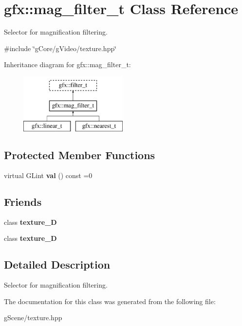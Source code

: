 \hypertarget{classgfx_1_1mag__filter__t}{\section{gfx\-:\-:mag\-\_\-filter\-\_\-t Class Reference}
\label{classgfx_1_1mag__filter__t}
}


Selector for magnification filtering.  




{\ttfamily \#include \char`\"{}g\-Core/g\-Video/texture.\-hpp\char`\"{}}

Inheritance diagram for gfx\-:\-:mag\-\_\-filter\-\_\-t\-:\begin{figure}[H]
\begin{center}
\leavevmode
\includegraphics[height=3.000000cm]{classgfx_1_1mag__filter__t}
\end{center}
\end{figure}
\subsection*{Protected Member Functions}
\begin{DoxyCompactItemize}
\item 
\hypertarget{classgfx_1_1mag__filter__t_a3dd85152c225206ec2c6b8c141c1428d}{virtual G\-Lint {\bfseries val} () const =0}\label{classgfx_1_1mag__filter__t_a3dd85152c225206ec2c6b8c141c1428d}

\end{DoxyCompactItemize}
\subsection*{Friends}
\begin{DoxyCompactItemize}
\item 
\hypertarget{classgfx_1_1mag__filter__t_a2039d67f6166ccf823c78e3476aad9aa}{class {\bfseries texture\-\_\-D}}\label{classgfx_1_1mag__filter__t_a2039d67f6166ccf823c78e3476aad9aa}

\item 
\hypertarget{classgfx_1_1mag__filter__t_a22ad86ef46c3b17357a0cd59e50bc7dd}{class {\bfseries texture\-\_\-D}}\label{classgfx_1_1mag__filter__t_a22ad86ef46c3b17357a0cd59e50bc7dd}

\end{DoxyCompactItemize}


\subsection{Detailed Description}
Selector for magnification filtering. 

The documentation for this class was generated from the following file\-:\begin{DoxyCompactItemize}
\item 
g\-Scene/texture.\-hpp\end{DoxyCompactItemize}
